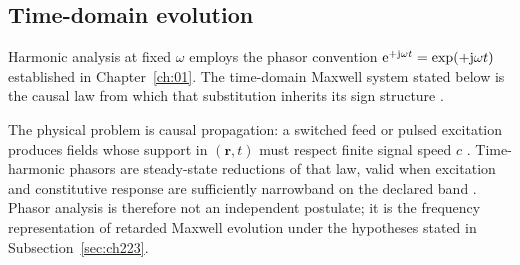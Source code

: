 \subsection{Time-domain evolution}
\label{sec:ch221}

Harmonic analysis at fixed $\omega$ employs the phasor convention $\mathrm{e}^{+\mathrm{j}\omega t}=\exp(+\mathrm{j}\omega t)$ established in Chapter~\ref{ch:01}. The time-domain Maxwell system stated below is the causal law from which that substitution inherits its sign structure \cite{stratton1941,poynting1884}.

The physical problem is causal propagation: a switched feed or pulsed excitation produces fields whose support in $(\mathbf{r},t)$ must respect finite signal speed $c$ \cite{maxwell1873}. Time-harmonic phasors are steady-state reductions of that law, valid when excitation and constitutive response are sufficiently narrowband on the declared band \cite{stratton1941,harrington2001}. Phasor analysis is therefore not an independent postulate; it is the frequency representation of retarded Maxwell evolution under the hypotheses stated in Subsection~\ref{sec:ch223}.

